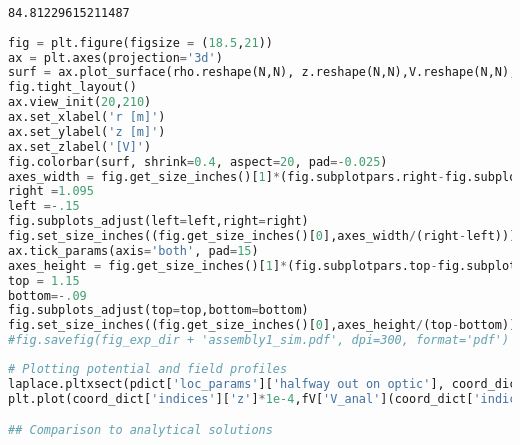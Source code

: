 \begin{lstlisting}
84.81229615211487
\end{lstlisting}

\begin{lstlisting}[frame=single, language=Python]
fig = plt.figure(figsize = (18.5,21))
ax = plt.axes(projection='3d') 
surf = ax.plot_surface(rho.reshape(N,N), z.reshape(N,N),V.reshape(N,N),rstride=1,cstride=1,cmap=cm.inferno,alpha=1,linewidth=10,rasterized=True)
fig.tight_layout()
ax.view_init(20,210)
ax.set_xlabel('r [m]')
ax.set_ylabel('z [m]')
ax.set_zlabel('[V]')
fig.colorbar(surf, shrink=0.4, aspect=20, pad=-0.025)
axes_width = fig.get_size_inches()[1]*(fig.subplotpars.right-fig.subplotpars.left)
right =1.095
left =-.15
fig.subplots_adjust(left=left,right=right) 
fig.set_size_inches((fig.get_size_inches()[0],axes_width/(right-left)))
ax.tick_params(axis='both', pad=15)
axes_height = fig.get_size_inches()[1]*(fig.subplotpars.top-fig.subplotpars.bottom)
top = 1.15
bottom=-.09
fig.subplots_adjust(top=top,bottom=bottom)             
fig.set_size_inches((fig.get_size_inches()[0],axes_height/(top-bottom)))
#fig.savefig(fig_exp_dir + 'assembly1_sim.pdf', dpi=300, format='pdf')
\end{lstlisting}

\begin{lstlisting}[frame=single, language=Python]
# Plotting potential and field profiles
laplace.pltxsect(pdict['loc_params']['halfway out on optic'], coord_dict, V)
plt.plot(coord_dict['indices']['z']*1e-4,fV['V_anal'](coord_dict['indices']['z']*1e-4))

## Comparison to analytical solutions
\end{lstlisting}


